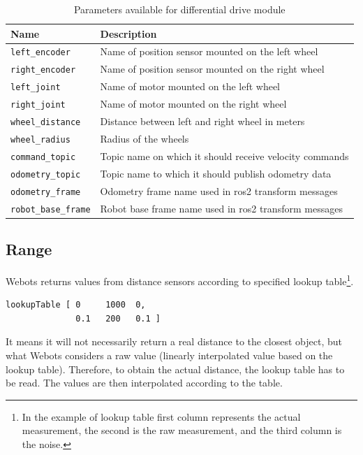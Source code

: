 \begin{table}[H]
    \centering
    \begin{tabular}{|l|l|}
        \hline
        \textbf{Name} & \textbf{Description} \\
        \hline
        \texttt{left\_encoder} & Name of position sensor mounted on the left wheel \\
        \hline
        \texttt{right\_encoder} & Name of position sensor mounted on the right wheel \\
        \hline
        \texttt{left\_joint} & Name of motor mounted on the left wheel \\
        \hline
        \texttt{right\_joint} & Name of motor mounted on the right wheel \\
        \hline
        \texttt{wheel\_distance} & Distance between left and right wheel in meters \\
        \hline
        \texttt{wheel\_radius} & Radius of the wheels \\
        \hline
        \texttt{command\_topic} & Topic name on which it should receive velocity commands \\
        \hline
        \texttt{odometry\_topic} & Topic name to which it should publish odometry data \\
        \hline
        \texttt{odometry\_frame} & Odometry frame name used in \ac{ros2} transform messages \\
        \hline
        \texttt{robot\_base\_frame} & Robot base frame name used in \ac{ros2} transform messages \\
        \hline
    \end{tabular}
    \caption{Parameters available for differential drive module}
    \label{tab:generalization:diff_driver_params}
\end{table}

\subsection{Range}
Webots returns values from distance sensors according to specified lookup table\footnote{In the example of lookup table first column represents the actual measurement, the second is the raw measurement, and the third column is the noise.}. 

\begin{verbatim}
lookupTable [ 0     1000  0,
              0.1   200   0.1 ]
\end{verbatim}

It means it will not necessarily return a real distance to the closest object, but what Webots considers a raw value (linearly interpolated value based on the lookup table).
Therefore, to obtain the actual distance, the lookup table has to be read.
The values are then interpolated according to the table.

